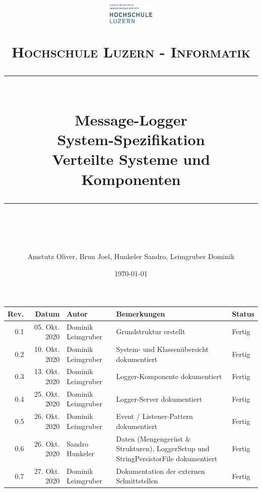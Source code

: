 \documentclass[11pt]{scrartcl} %
\title{	
	\begin{figure}[h]
		\begin{flushright}
			\includegraphics[width=0.2\textwidth]{Bilder/hsluLogo.eps}			
		\end{flushright}
	\end{figure}
	\vspace{10pt} %
	\normalfont\normalsize
	\textsc{Hochschule Luzern - Informatik}
	\vspace{12pt} %
	\rule{\linewidth}{0.5pt}\\ %
	{\huge Message-Logger}\\
	{\huge System-Spezifikation}\\ %
	\vspace{10pt} %
	{\large Verteilte Systeme und Komponenten }
	\vspace{12pt} %
	\rule{\linewidth}{2pt}\\ %
	\vspace{12pt} %
}
\author{\Large Amstutz Oliver, Brun Joel, Hunkeler Sandro, Leimgruber Dominik} %
\date{\normalsize\today} %
\begin{document}
\maketitle %
\pagestyle{fancy}
\thispagestyle{empty}
\setcounter{page}{0}
\newpage
\begin{center}
	\begin{tabularx}{\textwidth}{|r|r|l|X|l|}
		\hline
		\textbf{Rev.} & \textbf{Datum} & \textbf{Autor} & \textbf{Bemerkungen} & \textbf{Status}  \\ 
		\hline
		0.1 & 05. Okt. 2020 & Dominik Leimgruber & Grundstruktur erstellt & Fertig \\
		\hline
		0.2 & 10. Okt. 2020 & Dominik Leimgruber & System- und Klassenübersicht dokumentiert & Fertig \\
		\hline
		0.3 & 13. Okt. 2020 & Dominik Leimgruber & Logger-Komponente dokumentiert & Fertig \\
		\hline
		0.4 & 25. Okt. 2020 & Dominik Leimgruber & Logger-Server dokumentiert & Fertig \\
		\hline
		0.5 & 26. Okt. 2020 & Dominik Leimgruber & Event / Listener-Pattern dokumentiert & Fertig \\
		\hline
		0.6 & 26. Okt. 2020 & Sandro Hunkeler & Daten (Mengengerüst \& Strukturen), LoggerSetup und StringPersistorFile dokumentiert & Fertig \\
		\hline
		0.7 & 27. Okt. 2020 & Dominik Leimgruber & Dokumentation der externen Schnittstellen & Fertig \\
		\hline
	\end{tabularx}
\end{center}
\listoffigures
\listoftables
\newpage
\tableofcontents

\newpage








%


\end{document}
